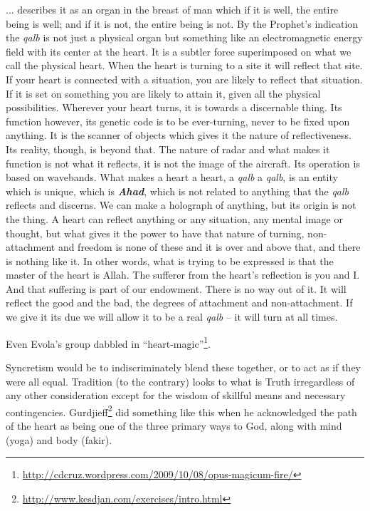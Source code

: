 \begin{quotex}
... describes it as an organ in the breast of man which if it is well, the entire being is well; and if it is not, the entire being is not. By the Prophet's indication the \emph{qalb} is not just a physical organ but something like an electromagnetic energy field with its center at the heart. It is a subtler force superimposed on what we call the physical heart. When the heart is turning to a site it will reflect that site. If your heart is connected with a situation, you are likely to reflect that situation. If it is set on something you are likely to attain it, given all the physical possibilities. Wherever your heart turns, it is towards a discernable thing. Its function however, its genetic code is to be ever-turning, never to be fixed upon anything. It is the scanner of objects which gives it the nature of reflectiveness. Its reality, though, is beyond that. The nature of radar and what makes it function is not what it reflects, it is not the image of the aircraft. Its operation is based on wavebands. What makes a heart a heart, a \emph{qalb} a \emph{qalb}, is an entity which is unique, which is \emph{\textbf{Ahad}}, which is not related to anything that the \emph{qalb} reflects and discerns. We can make a holograph of anything, but its origin is not the thing. A heart can reflect anything or any situation, any mental image or thought, but what gives it the power to have that nature of turning, non-attachment and freedom is none of these and it is over and above that, and there is nothing like it. In other words, what is trying to be expressed is that the master of the heart is Allah. The sufferer from the heart's reflection is you and I. And that suffering is part of our endowment. There is no way out of it. It will reflect the good and the bad, the degrees of attachment and non-attachment. If we give it its due we will allow it to be a real \emph{qalb} -- it will turn at all times.
\end{quotex}


Even Evola's group dabbled in ``heart-magic''\footnote{\url{http://cdcruz.wordpress.com/2009/10/08/opus-magicum-fire/}}.

Syncretism would be to indiscriminately blend these together, or to act as if they were all equal. Tradition (to the contrary) looks to what is Truth irregardless of any other consideration except for the wisdom of skillful means and necessary contingencies. Gurdjieff\footnote{\url{http://www.kesdjan.com/exercises/intro.html}} did something like this when he acknowledged the path of the heart as being one of the three primary ways to God, along with mind (yoga) and body (fakir).

